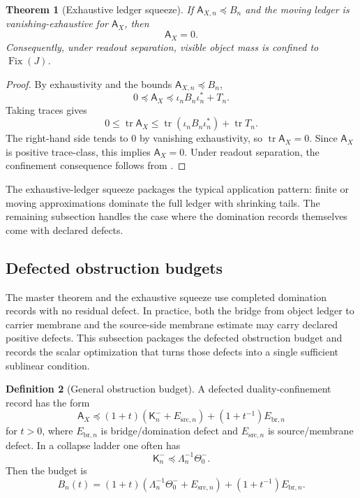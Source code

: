 \documentclass[11pt]{article}
\DeclareMathOperator{\tr}{tr}
\newcommand{\K}{\mathsf K}
\newcommand{\Fix}{\operatorname{Fix}}
\newcommand{\preceqq}{\preceq}
\newtheorem{theorem}{Theorem}[section]
\theoremstyle{definition}
\newtheorem{definition}[theorem]{Definition}
\begin{document}
\begin{theorem}[Exhaustive ledger squeeze]\label{thm:main:exhaustive-ledger-squeeze}
If \(\mathsf A_{X,n}\preceqq B_n\) and the moving ledger is
vanishing-exhaustive for \(\mathsf A_X\), then
\[
  \mathsf A_X=0.
\]
Consequently, under readout separation, visible object mass is confined
to \(\Fix(J)\).
\end{theorem}

\begin{proof}
By exhaustivity and the bounds \(\mathsf A_{X,n}\preceqq B_n\),
\[
  0\preceqq\mathsf A_X
  \preceqq \iota_nB_n\iota_n^*+T_n.
\]
Taking traces gives
\[
  0\le \tr\mathsf A_X
  \le \tr(\iota_nB_n\iota_n^*)+\tr T_n.
\]
The right-hand side tends to \(0\) by vanishing exhaustivity, so
\(\tr\mathsf A_X=0\).  Since \(\mathsf A_X\) is positive trace-class,
this implies \(\mathsf A_X=0\).  Under readout separation, the
confinement consequence follows from
.
\end{proof}

The exhaustive-ledger squeeze packages the typical application pattern:
finite or moving approximations dominate the full ledger with shrinking
tails.  The remaining subsection handles the case where the domination
records themselves come with declared defects.

\subsection{Defected obstruction budgets}

The master theorem and the exhaustive squeeze use completed domination
records with no residual defect.  In practice, both the bridge from
object ledger to carrier membrane and the source-side membrane estimate
may carry declared positive defects.  This subsection packages the
defected obstruction budget and records the scalar optimization that
turns those defects into a single sufficient sublinear condition.

\begin{definition}[General obstruction budget]\label{def:main:obstruction-budget}
A defected duality-confinement record has the form
\[
  \mathsf A_X
  \preceqq
  (1+t)(\K^-_n+E_{\mathrm{src},n})
  +(1+t^{-1})E_{\mathrm{br},n}
\]
for \(t>0\), where \(E_{\mathrm{br},n}\) is bridge/domination defect
and \(E_{\mathrm{src},n}\) is source/membrane defect.  In a collapse
ladder one often has
\[
  \K^-_n\preceqq \Lambda_n^{-1}\Theta_0^-.
\]
Then the budget is
\[
  B_n(t)
  =(1+t)(\Lambda_n^{-1}\Theta_0^-+E_{\mathrm{src},n})
   +(1+t^{-1})E_{\mathrm{br},n}.
\]
\end{definition}
\end{document}
